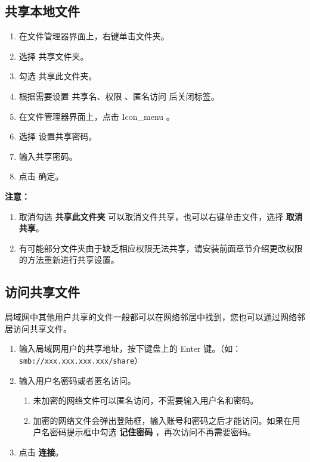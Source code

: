 \documentclass[doctor,openright,twoside]{sjtuthesis}
\providecommand{\tightlist}{%
    \setlength{\itemsep}{0pt}\setlength{\parskip}{0pt}}
\newcommand{\passthrough}[1]{#1}
\theoremstyle{plain}
\theoremstyle{definition}
\theoremstyle{remark}
\theoremstyle{ocrenumbox}
\theoremstyle{plain}
\begin{document}
\hypertarget{section-122}{%
\subsection{共享本地文件}\label{section-122}}

\begin{enumerate}
\def\labelenumi{\arabic{enumi}.}
\tightlist
\item
  在文件管理器界面上，右键单击文件夹。
\item
  选择 共享文件夹。
\item
  勾选 共享此文件夹。
\item
  根据需要设置 共享名、权限 、匿名访问 后关闭标签。
\item
  在文件管理器界面上，点击 Icon\_menu 。
\item
  选择 设置共享密码。
\item
  输入共享密码。
\item
  点击 确定。
\end{enumerate}

\textbf{注意：}

\begin{enumerate}
\def\labelenumi{\arabic{enumi}.}
\tightlist
\item
  取消勾选 \textbf{共享此文件夹} 可以取消文件共享，也可以右键单击文件，选择 \textbf{取消共享}。
\item
  有可能部分文件夹由于缺乏相应权限无法共享，请安装前面章节介绍更改权限的方法重新进行共享设置。
\end{enumerate}

\hypertarget{section-123}{%
\subsection{访问共享文件}\label{section-123}}

局域网中其他用户共享的文件一般都可以在网络邻居中找到，您也可以通过网络邻居访问共享文件。

\begin{enumerate}
\def\labelenumi{\arabic{enumi}.}
\tightlist
\item
  输入局域网用户的共享地址，按下键盘上的 Enter 键。（如：\passthrough{\lstinline!smb://xxx.xxx.xxx.xxx/share!}）
\item
  输入用户名密码或者匿名访问。

  \begin{enumerate}
  \def\labelenumii{\arabic{enumii})}
  \tightlist
  \item
    未加密的网络文件可以匿名访问，不需要输入用户名和密码。
  \item
    加密的网络文件会弹出登陆框，输入账号和密码之后才能访问。如果在用户名密码提示框中勾选 \textbf{记住密码} ，再次访问不再需要密码。
  \end{enumerate}
\item
  点击 \textbf{连接}。
\end{enumerate}
\end{document}
